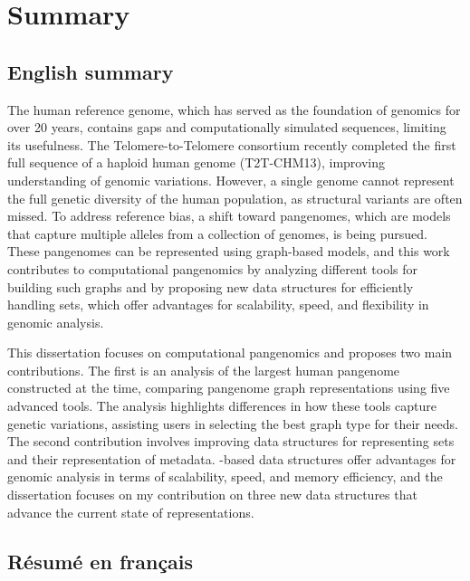  \chapter{Summary}
\label{sec:Summary}
\section{English summary}
The human reference genome, which has served as the foundation of genomics for over 20 years, contains gaps and computationally simulated sequences, limiting its usefulness. The Telomere-to-Telomere consortium recently completed the first full sequence of a haploid human genome (T2T-CHM13), improving understanding of genomic variations. However, a single genome cannot represent the full genetic diversity of the human population, as structural variants are often missed. To address reference bias, a shift toward pangenomes, which are models that capture multiple alleles from a collection of genomes, is being pursued. These pangenomes can be represented using graph-based models, and this work contributes to computational pangenomics by analyzing different tools for building such graphs and by proposing new data structures for efficiently handling \kmer sets, which offer advantages for scalability, speed, and flexibility in genomic analysis.

This dissertation focuses on computational pangenomics and proposes two main contributions. The first is an analysis of the largest human pangenome constructed at the time, comparing pangenome graph representations using five advanced tools. The analysis highlights differences in how these tools capture genetic variations, assisting users in selecting the best graph type for their needs. The second contribution involves improving data structures for representing \kmer sets and their representation of metadata. \kmer-based data structures offer advantages for genomic analysis in terms of scalability, speed, and memory efficiency, and the dissertation focuses on my contribution on three new data structures that advance the current state of \kmer representations.

\section{Résumé en français}